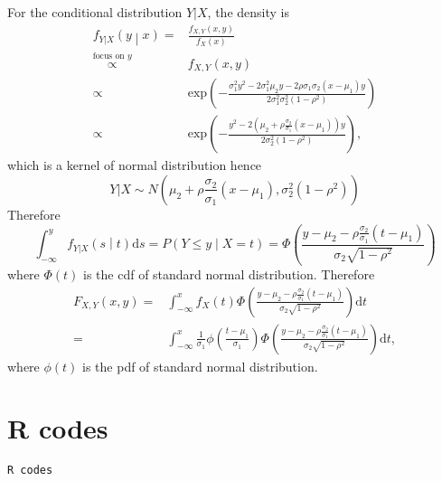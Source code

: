 \documentclass[a4paper,12pt]{article}
\begin{document}
For the conditional distribution $Y|X$, the density is
\[
  \begin{aligned}
    f_{Y|X}\left(y\middle|x\right)
    =& \frac{
      f_{X, Y}\left(x, y\right)
    }{
      f_X\left(x\right)
    }    \\
    \overset{\text{focus on } y}{\propto} & f_{X, Y}\left(x, y\right)    \\
    \propto& \mathrm{exp}\left(
      - \frac{
        \sigma_1^2y^2 - 2\sigma_1^2\mu_2y - 2\rho\sigma_1\sigma_2\left(x - \mu_1\right)y
      }{
        2\sigma_1^2\sigma_2^2\left(1 - \rho^2\right)
      }
    \right)    \\
    \propto & \mathrm{exp}\left(
      - \frac{
        y^2 - 2\left(\mu_2 + \rho\frac{\sigma_2}{\sigma_1}\left(x - \mu_1\right)\right)y
      }{2\sigma_2^2\left(1 - \rho^2\right)}
    \right)
    ,
  \end{aligned}
\]
which is a kernel of normal distribution hence
\[
  Y|X \sim N\left(
    \mu_2 + \rho\frac{\sigma_2}{\sigma_1}\left(x - \mu_1\right),
    \sigma_2^2\left(1 - \rho^2\right)
  \right)
\]
Therefore
\[
  \int_{-\infty}^y f_{Y|X}\left(s\middle|t\right)\mathrm{d}s
  = P\left(
    Y \leq y\middle| X = t
  \right)
  = \Phi\left(
    \frac{y - \mu_2 - \rho\frac{\sigma_2}{\sigma_1}\left(t - \mu_1\right)}{\sigma_2\sqrt{1 - \rho^2}}
  \right)
\]
where $\Phi\left(t\right)$ is the cdf of standard normal distribution. Therefore
\[
  \begin{aligned}
    F_{X, Y}\left(x, y\right)
    =& \int_{-\infty}^x
    f_X\left(t\right)
    \Phi\left(
      \frac{y - \mu_2 - \rho\frac{\sigma_2}{\sigma_1}\left(t - \mu_1\right)}{\sigma_2\sqrt{1 - \rho^2}}
    \right)
    \mathrm{d}t    \\
    = & \int_{-\infty}^x
    \frac{1}{\sigma_1}\phi\left(\frac{t - \mu_1}{\sigma_1}\right)
    \Phi\left(
      \frac{y - \mu_2 - \rho\frac{\sigma_2}{\sigma_1}\left(t - \mu_1\right)}{\sigma_2\sqrt{1 - \rho^2}}
    \right)
    \mathrm{d}t
    ,
  \end{aligned}
\]
where $\phi\left(t\right)$ is the pdf of standard normal distribution.



\clearpage
\appendix

\section{R codes}
\begin{verbatim}
R codes
\end{verbatim}
\end{document}
